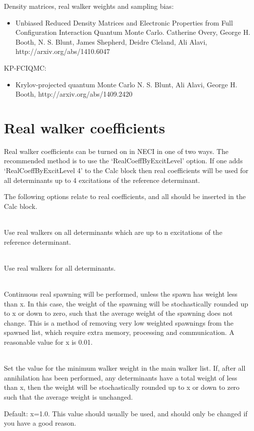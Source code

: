 \documentclass[a4paper,notitlepage]{scrreprt}
\newcommand\codeitem[1]{\needspace{1.5\baselineskip}\item[\textnormal{\ttfamily #1 \nopagebreak}] \hfill \\ \nopagebreak}
\begin{document}
Density matrices, real walker weights and sampling bias:
\begin{itemize}
\item Unbiased Reduced Density Matrices and Electronic Properties from Full Configuration Interaction Quantum Monte Carlo.
Catherine Overy, George H. Booth, N. S. Blunt, James Shepherd, Deidre Cleland, Ali Alavi, http://arxiv.org/abs/1410.6047
\end{itemize}

KP-FCIQMC:
\begin{itemize}
\item Krylov-projected quantum Monte Carlo
N. S. Blunt, Ali Alavi, George H. Booth, http://arxiv.org/abs/1409.2420
\end{itemize}

\section{Real walker coefficients}

    Real walker coefficients can be turned on in NECI in one of two ways. The
    recommended method is to use the `RealCoeffByExcitLevel' option. If one adds
    `RealCoeffByExcitLevel 4' to the Calc block then real coefficients will be
    used for all determinants up to 4 excitations of the reference determinant.

    The following options relate to real coefficients, and all should be
    inserted in the Calc block.
    \begin{description}
		\codeitem{RealCoeffByExcitLevel n}
            Use real walkers on all determinants which are up to n excitations
            of the reference determinant.
		\codeitem{AllRealCoeff}
            Use real walkers for all determinants.
		\codeitem{RealSpawnCutoff x}
            Continuous real spawning will be performed, unless the spawn has
            weight less than x. In this case, the weight of the spawning will
            be stochastically rounded up to x or down to zero, such that the
            average weight of the spawning does not change. This is a method of
            removing very low weighted spawnings from the spawned list, which
            require extra memory, processing and communication. A reasonable
            value for x is 0.01.
		\codeitem{SetOccupiedThresh x}
            Set the value for the minimum walker weight in the main walker
            list. If, after all annihilation has been performed, any
            determinants have a total weight of less than x, then the weight
            will be stochastically rounded up to x or down to zero such that
            the average weight is unchanged.

            Default: x=1.0. This value should usually be used, and should only
            be changed if you have a good reason.
    \end{description}
\end{document}
